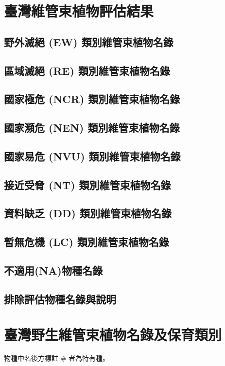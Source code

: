 \chapter{臺灣維管束植物評估結果}


\section{野外滅絕 (EW) 類別維管束植物名錄}

\section{區域滅絕 (RE) 類別維管束植物名錄}

\section{國家極危 (NCR) 類別維管束植物名錄}

\section{國家瀕危 (NEN) 類別維管束植物名錄}
\section{國家易危 (NVU) 類別維管束植物名錄}
\section{接近受脅 (NT) 類別維管束植物名錄}
\section{資料缺乏 (DD) 類別維管束植物名錄}
\section{暫無危機 (LC) 類別維管束植物名錄}
\section{不適用(NA)物種名錄}
\section{排除評估物種名錄與說明}

\chapter{臺灣野生維管束植物名錄及保育類別}

物種中名後方標註 \# 者為特有種。\\
\begin{multicols}{2}
\section*{}

\section*{}

\end{multicols}

